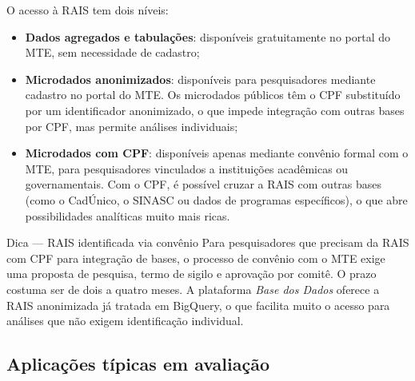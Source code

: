 O acesso à RAIS tem dois níveis:

\begin{itemize}
  \item \textbf{Dados agregados e tabulações}: disponíveis gratuitamente no portal do MTE, sem necessidade de cadastro;
  \item \textbf{Microdados anonimizados}: disponíveis para pesquisadores mediante cadastro no portal do MTE. Os microdados públicos têm o CPF substituído por um identificador anonimizado, o que impede integração com outras bases por CPF, mas permite análises individuais;
  \item \textbf{Microdados com CPF}: disponíveis apenas mediante convênio formal com o MTE, para pesquisadores vinculados a instituições acadêmicas ou governamentais. Com o CPF, é possível cruzar a RAIS com outras bases (como o CadÚnico, o SINASC ou dados de programas específicos), o que abre possibilidades analíticas muito mais ricas.
\end{itemize}

\begin{boxdica}{Dica — RAIS identificada via convênio}
Para pesquisadores que precisam da RAIS com CPF para integração de bases, o processo de convênio com o MTE exige uma proposta de pesquisa, termo de sigilo e aprovação por comitê. O prazo costuma ser de dois a quatro meses. A plataforma \textit{Base dos Dados} oferece a RAIS anonimizada já tratada em BigQuery, o que facilita muito o acesso para análises que não exigem identificação individual.
\end{boxdica}

\subsection{Aplicações típicas em avaliação}


